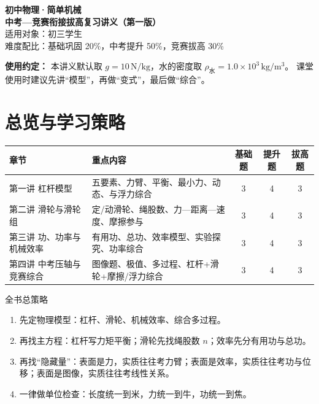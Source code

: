 \documentclass[12pt,a4paper]{ctexart}
\begin{document}
\begin{center}
{\LARGE \textbf{初中物理·简单机械}}\\[0.4em]
{\Large \textbf{中考—竞赛衔接拔高复习讲义（第一版）}}\\[0.8em]
适用对象：初三学生\\
难度配比：基础巩固 20\%，中考提升 50\%，竞赛拔高 30\%\\
\end{center}

\noindent\textbf{使用约定：}
本讲义默认取 $g=10\,\mathrm{N/kg}$，水的密度取 $\rho_{\text{水}}=1.0\times 10^3\,\mathrm{kg/m^3}$。
课堂使用时建议先讲“模型”，再做“变式”，最后做“综合”。

\tableofcontents

\section*{总览与学习策略}

\begin{center}
\small
\begin{tabularx}{\textwidth}{>{\raggedright\arraybackslash}p{3.1cm} X c c c}
\toprule
章节 & 重点内容 & 基础题 & 提升题 & 拔高题\\
\midrule
第一讲 杠杆模型 & 五要素、力臂、平衡、最小力、动态、与浮力综合 & 3 & 4 & 3 \\
第二讲 滑轮与滑轮组 & 定/动滑轮、绳股数、力—距离—速度、摩擦参与 & 3 & 4 & 3 \\
第三讲 功、功率与机械效率 & 有用功、总功、效率模型、实验探究、功率综合 & 3 & 4 & 3 \\
第四讲 中考压轴与竞赛综合 & 图像题、极值、多过程、杠杆+滑轮+摩擦/浮力综合 & 3 & 4 & 3 \\
\bottomrule
\end{tabularx}
\end{center}

\begin{modelbox}{全书总策略}
\begin{enumerate}[label=\arabic*.]
\item 先定物理模型：杠杆、滑轮、机械效率、综合多过程。
\item 再找主方程：杠杆写力矩平衡；滑轮先找绳股数 $n$；效率先分有用功与总功。
\item 再找“隐藏量”：表面是力，实质往往考力臂；表面是效率，实质往往考功与位移；表面是图像，实质往往考线性关系。
\item 一律做单位检查：长度统一到米，力统一到牛，功统一到焦。
\end{enumerate}
\end{modelbox}
\end{document}
